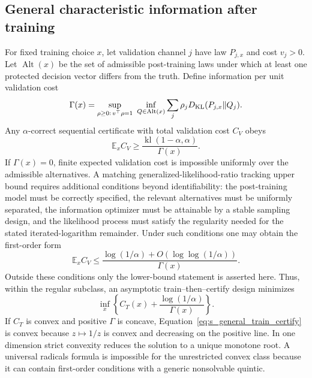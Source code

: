 \documentclass[11pt,letterpaper]{article}
\theoremstyle{plain}
\newcommand{\1}{\mathbf 1}
\begin{document}
\subsection{General characteristic information after training}
For fixed training choice $x$, let validation channel $j$ have law $P_{j,x}$ and cost $v_j>0$. Let $\operatorname{Alt}(x)$ be the set of admissible post-training laws under which at least one protected decision vector differs from the truth. Define information per unit validation cost
\begin{equation}
 \Gamma(x)=\sup_{\rho\ge0:\,v^\top\rho=1}\ \inf_{Q\in\operatorname{Alt}(x)}
 \sum_j \rho_j D_{\rm KL}(P_{j,x}\|Q_j).
\label{eq:s_gamma_x}
\end{equation}
Any $\alpha$-correct sequential certificate with total validation cost $C_V$ obeys
\begin{equation}
 \mathbb E_x C_V\ge \frac{\operatorname{kl}(1-\alpha,\alpha)}{\Gamma(x)}.
\label{eq:s_gamma_lower}
\end{equation}
If $\Gamma(x)=0$, finite expected validation cost is impossible uniformly over the admissible alternatives. A matching generalized-likelihood-ratio tracking upper bound requires additional conditions beyond identifiability: the post-training model must be correctly specified, the relevant alternatives must be uniformly separated, the information optimizer must be attainable by a stable sampling design, and the likelihood process must satisfy the regularity needed for the stated iterated-logarithm remainder. Under such conditions one may obtain the first-order form
\begin{equation}
 \mathbb E_x C_V\le \frac{\log(1/\alpha)+O(\log\log(1/\alpha))}{\Gamma(x)}.
\label{eq:s_gamma_upper}
\end{equation}
Outside these conditions only the lower-bound statement is asserted here. Thus, within the regular subclass, an asymptotic train--then--certify design minimizes
\begin{equation}
 \inf_x\left\{C_T(x)+\frac{\log(1/\alpha)}{\Gamma(x)}\right\}.
\label{eq:s_general_train_certify}
\end{equation}
If $C_T$ is convex and positive $\Gamma$ is concave, Equation~\ref{eq:s_general_train_certify} is convex because $z\mapsto1/z$ is convex and decreasing on the positive line. In one dimension strict convexity reduces the solution to a unique monotone root. A universal radicals formula is impossible for the unrestricted convex class because it can contain first-order conditions with a generic nonsolvable quintic.
\end{document}
